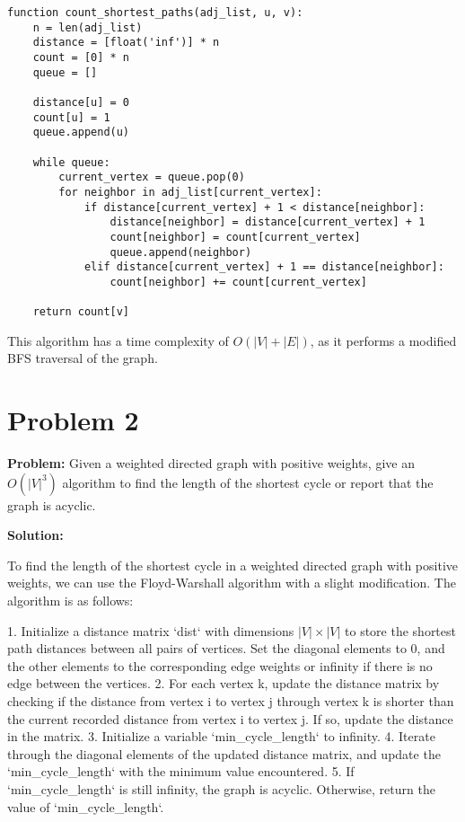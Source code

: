 \documentclass[11pt]{article}
\begin{document}
    \begin{verbatim}
function count_shortest_paths(adj_list, u, v):
    n = len(adj_list)
    distance = [float('inf')] * n
    count = [0] * n
    queue = []

    distance[u] = 0
    count[u] = 1
    queue.append(u)

    while queue:
        current_vertex = queue.pop(0)
        for neighbor in adj_list[current_vertex]:
            if distance[current_vertex] + 1 < distance[neighbor]:
                distance[neighbor] = distance[current_vertex] + 1
                count[neighbor] = count[current_vertex]
                queue.append(neighbor)
            elif distance[current_vertex] + 1 == distance[neighbor]:
                count[neighbor] += count[current_vertex]

    return count[v]
    \end{verbatim}

    This algorithm has a time complexity of $O(|V| + |E|)$, as it performs a modified BFS traversal of the graph.


    \section{Problem 2}

    \textbf{Problem:} Given a weighted directed graph with positive weights, give an $O(|V|^3)$ algorithm to find the length of the shortest cycle or report that the graph is acyclic.

    \textbf{Solution:}

    To find the length of the shortest cycle in a weighted directed graph with positive weights, we can use the Floyd-Warshall algorithm with a slight modification. The algorithm is as follows:

    1. Initialize a distance matrix `dist` with dimensions $|V| \times |V|$ to store the shortest path distances between all pairs of vertices. Set the diagonal elements to 0, and the other elements to the corresponding edge weights or infinity if there is no edge between the vertices.
    2. For each vertex k, update the distance matrix by checking if the distance from vertex i to vertex j through vertex k is shorter than the current recorded distance from vertex i to vertex j. If so, update the distance in the matrix.
    3. Initialize a variable `min_cycle_length` to infinity.
    4. Iterate through the diagonal elements of the updated distance matrix, and update the `min_cycle_length` with the minimum value encountered.
    5. If `min_cycle_length` is still infinity, the graph is acyclic. Otherwise, return the value of `min_cycle_length`.
\end{document}
